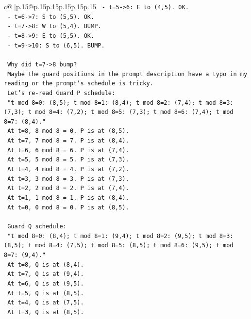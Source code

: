 \documentclass{article}
\begin{document}
{\begin{supertabular}{c@{$\;$}|p{.15\linewidth}@{}p{.15\linewidth}p{.15\linewidth}p{.15\linewidth}p{.15\linewidth}p{.15\linewidth}}
{{{\texttt{    {-} t=5{-}>6: E to (4,5). OK.} \\
\texttt{    {-} t=6{-}>7: S to (5,5). OK.} \\
\texttt{    {-} t=7{-}>8: W to (5,4). BUMP.} \\
\texttt{    {-} t=8{-}>9: E to (5,5). OK.} \\
\texttt{    {-} t=9{-}>10: S to (6,5). BUMP.} \\
\\ 
\texttt{  Why did t=7{-}>8 bump?} \\
\texttt{  Maybe the guard positions in the prompt description have a typo in my reading or the prompt's schedule is tricky.} \\
\texttt{  Let's re{-}read Guard P schedule:} \\
\texttt{  "t mod 8=0: (8,5); t mod 8=1: (8,4); t mod 8=2: (7,4); t mod 8=3: (7,3); t mod 8=4: (7,2); t mod 8=5: (7,3); t mod 8=6: (7,4); t mod 8=7: (8,4)."} \\
\texttt{  At t=8, 8 mod 8 = 0. P is at (8,5).} \\
\texttt{  At t=7, 7 mod 8 = 7. P is at (8,4).} \\
\texttt{  At t=6, 6 mod 8 = 6. P is at (7,4).} \\
\texttt{  At t=5, 5 mod 8 = 5. P is at (7,3).} \\
\texttt{  At t=4, 4 mod 8 = 4. P is at (7,2).} \\
\texttt{  At t=3, 3 mod 8 = 3. P is at (7,3).} \\
\texttt{  At t=2, 2 mod 8 = 2. P is at (7,4).} \\
\texttt{  At t=1, 1 mod 8 = 1. P is at (8,4).} \\
\texttt{  At t=0, 0 mod 8 = 0. P is at (8,5).} \\
\\ 
\texttt{  Guard Q schedule:} \\
\texttt{  "t mod 8=0: (8,4); t mod 8=1: (9,4); t mod 8=2: (9,5); t mod 8=3: (8,5); t mod 8=4: (7,5); t mod 8=5: (8,5); t mod 8=6: (9,5); t mod 8=7: (9,4)."} \\
\texttt{  At t=8, Q is at (8,4).} \\
\texttt{  At t=7, Q is at (9,4).} \\
\texttt{  At t=6, Q is at (9,5).} \\
\texttt{  At t=5, Q is at (8,5).} \\
\texttt{  At t=4, Q is at (7,5).} \\
\texttt{  At t=3, Q is at (8,5).} \\
}}}
\end{supertabular}}
\end{document}
